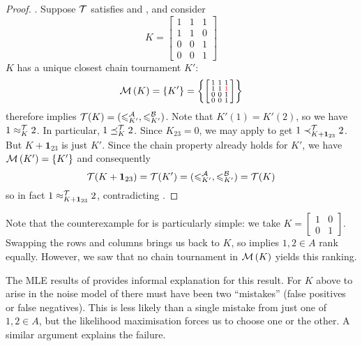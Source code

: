 \begin{proof}
    \posresp{}. Suppose $\mathcal{T}$ satisfies \chainmin{} and
    \posresp{}, and consider
    \[
        K = \left[\begin{smallmatrix}
            1 & 1 & 1 \\
            1 & 1 & 0 \\
            0 & 0 & 1 \\
            0 & 0 & 1
        \end{smallmatrix}\right]
    \]
    $K$ has a unique closest chain tournament $K'$:
    \[
        \operatorname{\mathcal{M}}\left({K}\right) = \{K'\} = \left\{
            \left[\begin{smallmatrix}
            1 & 1 & 1 \\
            1 & 1 & \color{red}{1} \\
            0 & 0 & 1 \\
            0 & 0 & 1
        \end{smallmatrix}\right]
        \right\}
    \]
    \chainmin{} therefore implies $\mathcal{T}(K) = ({\leqslant^{\mathcal{A}}_{K'}},
    {\leqslant^{\mathcal{B}}_{K'}})$.  Note that $K'(1) = K'(2)$, so we have $1 \approx_K^{\mathcal{T}} 2$.
    In particular, $1 \preceq_K^{\mathcal{T}} 2$. Since $K_{23} = 0$, we may apply
    \posresp{} to get $1 \prec_{K + \bm{1}_{23}}^{\mathcal{T}} 2$.  But $K +
    \bm{1}_{23}$ is just $K'$. Since the chain property already holds for
    $K'$, we have $\operatorname{\mathcal{M}}\left({K'}\right) = \{K'\}$ and consequently
    \[
        \mathcal{T}(K + \bm{1}_{23})
        = \mathcal{T}(K')
        = ({\leqslant^{\mathcal{A}}_{K'}}, {\leqslant^{\mathcal{B}}_{K'}})
        = \mathcal{T}(K)
    \]
    so in fact $1 \approx_{K + \bm{1}_{23}}^{\mathcal{T}} 2$, contradicting
    \posresp{}.
\end{proof}

Note that the counterexample for \anon{} is particularly simple: we
take $K = \left[\begin{smallmatrix} 1&0\\0&1 \end{smallmatrix}\right]$.
    Swapping the rows and columns brings us back to $K$, so \anon{} implies
$1, 2 \in A$ rank equally. However, we saw that no chain tournament in
$\operatorname{\mathcal{M}}\left({K}\right)$ yields this ranking.

The MLE results of  provides informal
explanation for this result. For $K$ above to arise in the noise model of
 there must have been two ``mistakes'' (false positives or
false negatives). This is less likely than a single mistake from just one of
$1,2 \in A$, but the likelihood maximisation forces us to choose one or the
other. A similar argument explains the \posresp{} failure.

